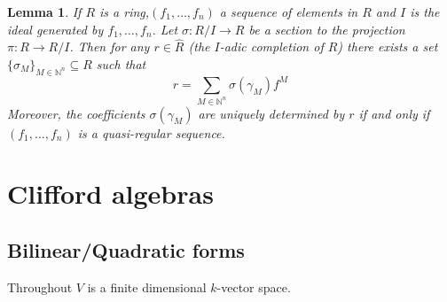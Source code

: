 \documentclass[12pt]{article}
\theoremstyle{plain}
\newtheorem{lemma}[thm]{Lemma}
\theoremstyle{definition}
\newcommand{\bb}[1]{\mathbb{#1}}
\newcommand{\lto}{\longrightarrow}
\begin{document}
\begin{lemma}
	If $R$ is a ring,$(f_1, \ldots, f_n)$ a sequence of elements in $R$ and $I$ is the ideal generated by $f_1, \ldots, f_n$. Let $\sigma: R/I \lto R$ be a section to the projection $\pi: R \lto R/I$. Then for any $r \in \hat{R}$ (the $I$-adic completion of $R$) there exists a set $\{ \sigma_M \}_{M \in \bb{N}^n} \subseteq R$ such that
	\begin{equation}
		r = \sum_{M \in \bb{N}^n} \sigma(\gamma_M)f^M
		\end{equation}
	Moreover, the coefficients $\sigma(\gamma_M)$ are uniquely determined by $r$ if and only if $(f_1, \ldots, f_n)$ is a quasi-regular sequence.
	\end{lemma}




\section{Clifford algebras}
\subsection{Bilinear/Quadratic forms}
Throughout $V$ is a finite dimensional $k$-vector space. 
\end{document}
